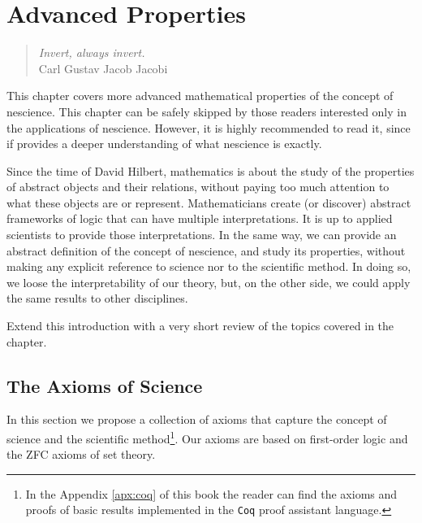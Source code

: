 %
%


\chapter{Advanced Properties}
\label{chap:Properties-Nescience}

\begin{quote}
\begin{flushright}
\emph{Invert, always invert.}\\
Carl Gustav Jacob Jacobi\\
\end{flushright}
\end{quote}
\bigskip

This chapter covers more advanced mathematical properties of the concept of nescience. This chapter can be safely skipped by those readers interested only in the applications of nescience. However, it is highly recommended to read it, since if provides a deeper understanding of what nescience is exactly.

Since the time of David Hilbert, mathematics is about the study of the properties of abstract objects and their relations, without paying too much attention to what these objects are or represent. Mathematicians create (or discover) abstract frameworks of logic that can have multiple interpretations. It is up to applied scientists to provide those interpretations. In the same way, we can provide an abstract definition of the concept of nescience, and study its properties, without making any explicit reference to science nor to the scientific method. In doing so, we loose the interpretability of our theory, but, on the other side, we could apply the same results to other disciplines.

{\color{red} Extend this introduction with a very short review of the topics covered in the chapter.}

%
%

\section{The Axioms of Science}

In this section we propose a collection of axioms that capture the concept of science and the scientific method\footnote{In the Appendix \ref{apx:coq} of this book the reader can find the axioms and proofs of basic results implemented in the \texttt{Coq} proof assistant language.}. Our axioms are based on first-order logic and the ZFC axioms of set theory.

